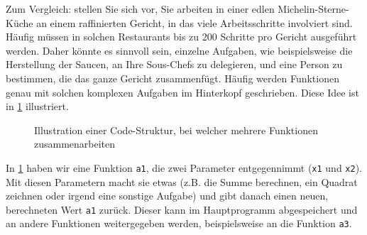 Zum Vergleich: stellen Sie sich vor, Sie arbeiten in einer edlen Michelin-Sterne-Küche an einem raffinierten Gericht, in das viele Arbeitsschritte involviert sind. Häufig müssen in solchen Restaurants bis zu 200 Schritte pro Gericht ausgeführt werden. Daher könnte es sinnvoll sein, einzelne Aufgaben, wie beispielsweise die Herstellung der Saucen, an Ihre Sous-Chefs zu delegieren, und eine Person zu bestimmen, die das ganze Gericht zusammenfügt. Häufig werden Funktionen genau mit solchen komplexen Aufgaben im Hinterkopf geschrieben. Diese Idee ist in \cref{fig:funktionen-mehrere} illustriert.

\begin{figure}[H]
	\centering
	\caption{Illustration einer Code-Struktur, bei welcher mehrere Funktionen zusammenarbeiten}
	\label{fig:funktionen-mehrere}
\end{figure}

In \cref{fig:funktionen-mehrere} haben wir eine Funktion \lstinline|a1|, die zwei Parameter entgegennimmt (\lstinline|x1| und \lstinline|x2|). Mit diesen Parametern macht sie etwas (z.B. die Summe berechnen, ein Quadrat zeichnen oder irgend eine sonstige Aufgabe) und gibt danach einen neuen, berechneten Wert \lstinline|a1| zurück. Dieser kann im Hauptprogramm abgespeichert und an andere Funktionen weitergegeben werden, beispielsweise an die Funktion \lstinline|a3|.


